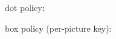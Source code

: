 \documentclass[varwidth=10cm, border=3pt]{standalone}
\begin{document}
dot policy:
\begin{tenkzfree}
\end{tenkzfree}

\medskip
box policy (per-picture key):
\begin{tenkzfree}[tensor style=box]
\end{tenkzfree}
\end{document}
